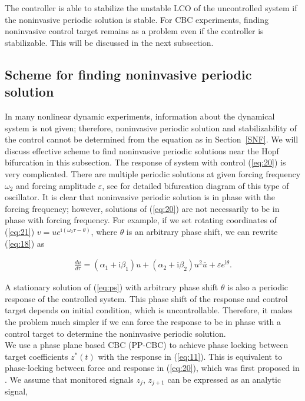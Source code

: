 \documentclass[openacc]{rsproca_new}%
\def\epsilon{\varepsilon}
\newcommand{\Eref}[1]{(\ref{#1})}
\newcommand{\Sref}[1]{Section~\ref{#1}}
\begin{document}
\noindent The controller is able to stabilize the unstable LCO of the uncontrolled system if the noninvasive periodic solution is stable. For CBC experiments, finding noninvasive control target remains as a problem even if the controller is stabilizable. This will be discussed in the next subsection.

\subsection{Scheme for finding noninvasive periodic solution}\label{FNP}

In many nonlinear dynamic experiments, information about the dynamical system is not given; therefore, noninvasive periodic solution and stabilizability of the control cannot be determined from the equation as in \Sref{SNF}. We will discuss effective scheme to find noninvasive periodic solutions near the Hopf bifurcation in this subsection. The response of system with control \Eref{eq:20} is very complicated. There are multiple periodic solutions at given forcing frequency $\omega_2$ and forcing amplitude $\epsilon$, see \cite{zhang2011periodically,wiser2015bifurcations} for detailed bifurcation diagram of this type of oscillator. It is clear that noninvasive periodic solution is in phase with the forcing frequency; however, solutions of \Eref{eq:20} are not necessarily to be in phase with forcing frequency. For example, if we set rotating coordinates of \Eref{eq:21} $v=ue^{\textrm{i}(\omega_2 \tau-\theta)}$, where $\theta$ is an arbitrary phase shift, we can rewrite \Eref{eq:18}
as

\begin{align}\label{eq:ps}
\frac{du}{d\tau}=(\alpha_1+\textrm{i}\beta_1)u+(\alpha_2+\textrm{i}\beta_2)u^2 \bar u+\epsilon e^{\textrm{i}\theta}.
\end{align}

\noindent A stationary solution of \Eref{eq:ps} with arbitrary phase shift $\theta$ is also a periodic response of the controlled system. This phase shift of the response and control target depends on initial condition, which is uncontrollable. Therefore, it makes the problem much simpler if we can force the response to be in phase with a control target to determine the noninvasive periodic solution.\\
We use a phase plane based CBC (PP-CBC) to achieve phase locking between target coefficients $z^*(t)$ with the response in \Eref{eq:11}. This is equivalent to phase-locking between force and response in \Eref{eq:20}, which was first proposed in \cite{irene}. We assume that monitored signals $z_j$, $z_{j+1}$ can be expressed as an analytic signal,
\end{document}
